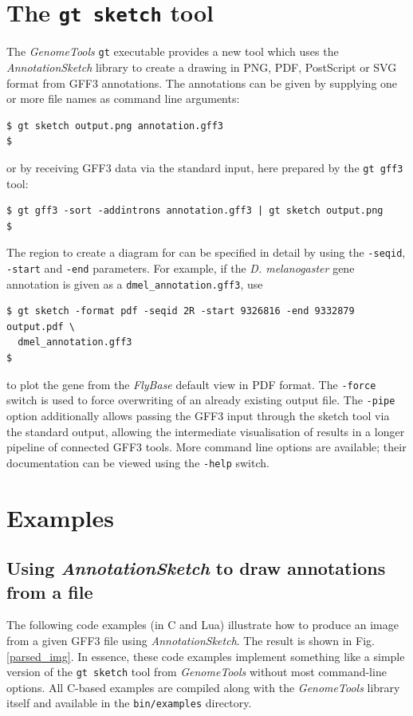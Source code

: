 \documentclass[a4paper]{scrreprt}
\begin{document}
\section{The \texttt{gt sketch} tool}

The \emph{GenomeTools} \texttt{gt} executable provides a new tool which uses the \emph{AnnotationSketch} library to create a drawing in PNG, PDF, PostScript or SVG format from GFF3 annotations. The annotations can be given by supplying one or more file names as command line arguments:
\small
\begin{verbatim}
$ gt sketch output.png annotation.gff3
$
\end{verbatim}
\normalsize
or by receiving GFF3 data via the standard input, here prepared by the \texttt{gt gff3} tool:
\small
\begin{verbatim}
$ gt gff3 -sort -addintrons annotation.gff3 | gt sketch output.png
$
\end{verbatim}
\normalsize
The region to create a diagram for can be specified in detail by using the \texttt{-seqid}, \texttt{-start} and \texttt{-end} parameters. For example, if the \emph{D. melanogaster} gene annotation is given as a \texttt{dmel\_annotation.gff3}, use
\small
\begin{verbatim}
$ gt sketch -format pdf -seqid 2R -start 9326816 -end 9332879 output.pdf \
  dmel_annotation.gff3
$
\end{verbatim}
\normalsize
to plot the gene from the \emph{FlyBase} default view in PDF format.
The \texttt{-force} switch is used to force overwriting of an already existing output file. The \texttt{-pipe} option additionally allows passing the GFF3 input through the sketch tool via the standard output, allowing the intermediate visualisation of results in a longer pipeline of connected GFF3 tools. More command line options are available; their documentation can be viewed using the \texttt{-help} switch.


\section{Examples}


\subsection{Using \emph{AnnotationSketch} to draw annotations from a file}
The following code examples (in C and Lua) illustrate how to produce an image from a given GFF3 file using \emph{AnnotationSketch}. The result is shown in Fig. \ref{parsed_img}. In essence, these code examples implement something like a simple version of the \texttt{gt sketch} tool from \emph{GenomeTools} without most command-line options. All C-based examples are compiled along with the \emph{GenomeTools} library itself and available in the \texttt{bin/examples} directory.
\end{document}

